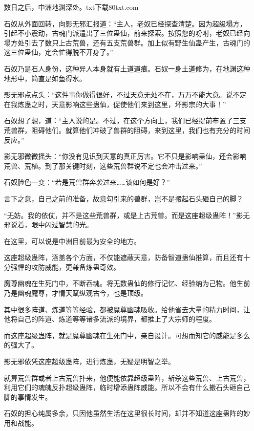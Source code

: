 
\begin{this_body}

数日之后，中洲地渊深处。txt下载80txt.com

石奴从外面回转，向影无邪汇报道：“主人，老奴已经探查清楚。因为超级塌方，引起不小震动，古魂门派遣出了三位蛊仙，前来探索。按照您的吩咐，老奴已经向塌方处引去了数只上古荒兽，还有五支荒兽群。加上似有野生仙蛊产生，古魂门的这三位蛊仙，定会忙得脱不开身了。”

石奴乃是石人身份，这种异人本身就有土道道痕。石奴一身土道修为，在地渊这种地形中，简直是如鱼得水。

影无邪点点头：“这件事你做得很好，不过天意无处不在，万万不能大意。说不定在我炼蛊之时，天意影响这些蛊仙，促使他们来到这里，坏影宗的大事！”

石奴想了想，道：“主人说的是。不过，在这个方向上，我们已经提前布置了三支荒兽群，阻碍他们。就算他们冲破了兽群的阻碍，来到这里，我们也有充分的时间反应。”

影无邪微微摇头：“你没有见识到天意的真正厉害。它不只是影响蛊仙，还会影响荒兽、荒植。到了那关键时刻，这些荒兽群说不定也会冲击过来。”

石奴脸色一变：“若是荒兽群奔袭过来……该如何是好？”

言下之意，自己之前的准备，故意勾引来的兽群，岂不是搬起石头砸自己的脚？

“无妨。我的依仗，并不是这些荒兽群，或是上古荒兽。而是这座超级蛊阵！”影无邪说着，眼中闪过智慧的光。

在这里，可以说是中洲目前最为安全的地方。

这座超级蛊阵，涵盖各个方面，不仅能遮蔽天意，防备智道蛊仙推算，而且还有十分强悍的攻防威能，更兼备炼蛊奇效。

魔尊幽魂在生死门中，不断吞魂。将无数蛊仙的修行记忆、经验纳为己物。他生前乃是幽魂魔尊，才情天赋纵观古今，也是顶级。

其中很多阵道、炼道等等经验，都被魔尊幽魂吸收。给他省去大量的精力时间，让他将自己的阵道、炼道等等诸多流派的境界，都推上了大宗师的程度。

而这座超级蛊阵，就是魔尊幽魂在生死门中，亲自设计。可想而知它的威能是多么的强大了。

影无邪依凭这座超级蛊阵，进行炼蛊，无疑是明智之举。

就算荒兽群或者上古荒兽扑来，他便能依靠超级蛊阵，斩杀这些荒兽、上古荒兽，利用它们的魂魄反扑超级蛊阵，临时增添蛊阵威能。所以不会有什么搬石头砸自己脚的事情发生。

石奴的担心纯属多余，只因他虽然生活在这里很长时间，却并不知道这座蛊阵的妙用和战能。


\end{this_body}
